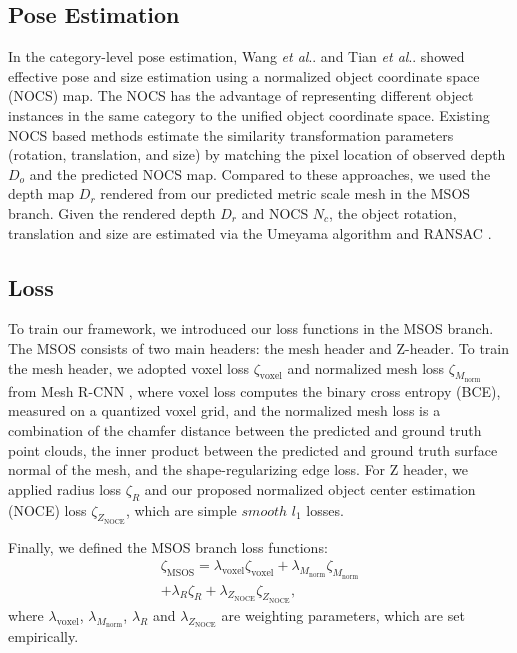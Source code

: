 \documentclass[letterpaper, 10 pt, journal, twoside]{IEEEtran}
\makeatletter
\DeclareRobustCommand\onedot{\futurelet\@let@token\@onedot}
\def\@onedot{\ifx\@let@token.\else.\null\fi\xspace}
\def\etal{\emph{et al}\onedot}
\newcommand{\CH}[1]{{#1}}
\makeatother
\begin{document}
\subsection{Pose Estimation}
\label{subsec:pose_estimation}
In the category-level pose estimation, Wang \etal \cite{wang2019normalized} and Tian \etal \cite{Tian2020prior} showed effective pose and size estimation using a normalized object coordinate space (NOCS) map.
The NOCS has the advantage of representing different object instances in the same category to the unified object coordinate space.
Existing NOCS based methods \cite{wang2019normalized, Tian2020prior} estimate the \CH{similarity transformation parameters (rotation, translation, and size)} by matching the pixel location of observed depth $D_o$ and the predicted NOCS map.
Compared to these approaches, we used the depth map $D_r$ rendered from our predicted metric scale mesh in the MSOS branch.
Given the rendered depth $D_r$ and NOCS $N_{c}$, \CH{the object rotation, translation} and size are estimated via the Umeyama algorithm \cite{umeyama1991least} and RANSAC \cite{fischler1981random}.



\subsection{Loss}
\label{subsec:loss_function}
To train our framework, we introduced our loss functions in the MSOS branch.
\CH{
The MSOS consists of two main headers: the mesh header and Z-header.
To train the mesh header, we adopted voxel loss $\zeta_\text{voxel}$ and normalized mesh loss $\zeta_{M_\text{norm}}$ from Mesh R-CNN \cite{gkioxari2019mesh}, where voxel loss computes the binary cross entropy (BCE), measured on a quantized voxel grid, and the normalized mesh loss is a combination of the chamfer distance between the predicted and ground truth point clouds, the inner product between the predicted and ground truth surface normal of the mesh, and the shape-regularizing edge loss.
For Z header, we applied radius loss $\zeta_R$ and our proposed normalized object center estimation (NOCE) loss $\zeta_{Z_\text{NOCE}}$, which are simple $smooth$ $l_1$ losses.}

Finally, we defined the MSOS branch loss functions: 
\begin{equation}\label{eq:all_loss}
\begin{split}
 \zeta_{\text{MSOS}} =  \lambda_{\text{voxel}} \zeta_{\text{voxel}} + \lambda_{M_{\text{norm}}} \zeta_{M_{\text{norm}}} \\
 + \lambda_{R} \zeta_{R} + \lambda_{Z_{\text{NOCE}}} \zeta_{Z_{\text{NOCE}}},
 \end{split}
\end{equation}
\CH{
where $\lambda_{\text{voxel}}$, $\lambda_{M_{\text{norm}}}$, $\lambda_R$ and $\lambda_{Z_{\text{NOCE}}}$ are weighting parameters, which are set empirically.}
\end{document}
